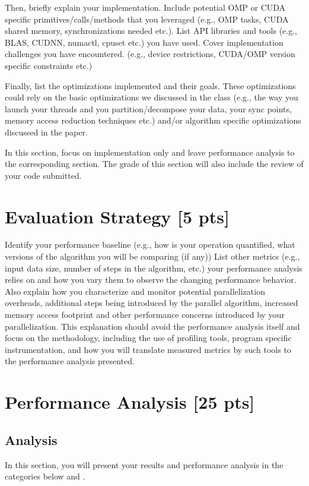 \documentclass[sigconf,authorversion,nonacm]{acmart}
\begin{document}
Then, briefly explain your implementation. Include potential OMP or CUDA specific primitives/calls/methods that you leveraged (e.g., OMP tasks, CUDA shared memory, synchronizations needed etc.). List API libraries and tools (e.g., BLAS, CUDNN, numactl, cpuset etc.) you have used. Cover implementation challenges you have encountered. (e.g., device restrictions, CUDA/OMP version specific constraints etc.)								

Finally, list the optimizations implemented and their goals. These optimizations could rely on the basic optimizations we discussed in the class (e.g., the way you launch your threads and you partition/decompose your data, your sync points, memory access reduction techniques etc.) and/or algorithm specific optimizations discussed in the paper.

In this section, focus on implementation only and leave performance analysis to the corresponding section. The grade of this section will also include the review of your code submitted. 

\section{Evaluation Strategy {\small {[5 pts]}}}
Identify your performance baseline (e.g., how is your operation quantified, what versions of the algorithm you will be comparing (if any)) List other metrics (e.g., input data size, number of steps in the algorithm, etc.) your performance analysis  relies on and how you vary them to observe the changing performance behavior. Also explain how you characterize and monitor potential parallelization overheads, additional steps being introduced by the parallel algorithm, increased memory access footprint and other performance concerns introduced by your parallelization. This explanation should avoid the performance analysis itself and focus on the methodology, including the use of profiling tools, program specific instrumentation, and how you will translate measured metrics by such tools to the performance analysis presented. 

\section{Performance Analysis {\small {[25 pts]}}}

\subsection{Analysis}
In this section, you will present your results and performance analysis in the categories below and .
\end{document}
